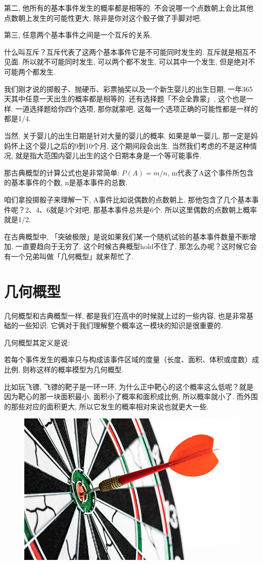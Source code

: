 第二, 他所有的基本事件发生的概率都是相等的. 不会说哪一个点数朝上会比其他点数朝上发生的可能性更大, 除非是你对这个骰子做了手脚对吧. 

第三, 任意两个基本事件之间是一个互斥的关系. 

什么叫互斥？互斥代表了这两个基本事件它是不可能同时发生的. 互斥就是相互不见面. 所以就不可能同时发生, 可以两个都不发生, 可以其中一个发生, 但是绝对不可能两个都发生. 

我们刚才说的掷骰子、抛硬币、彩票抽奖以及一个新生婴儿的出生日期, 一年365天其中任意一天出生的概率都是相等的. 还有选择题「不会全靠蒙」, 这个也是一样. 一道选择题给你四个选项, 那你就蒙吧, 这每一个选项正确的可能性都是一样的都是1/4. 

当然, 关于婴儿的出生日期是针对大量的婴儿的概率. 如果是单一婴儿, 那一定是妈妈怀上这个婴儿之后的9到10个月, 这个期间段会出生. 当然我们考虑的不是这种情况, 就是指大范围内婴儿出生的这个日期本身是一个等可能事件. 

那古典概型的计算公式也是非常简单: $P(A)  = m/n$, m代表了A这个事件所包含的基本事件的个数, n是基本事件的总数. 

咱们拿投掷骰子来理解一下, A事件比如说偶数的点数朝上, 那他包含了几个基本事件呢？2、4、6就是3个对吧, 那基本事件总共是6个. 所以这里偶数的点数朝上概率就是1/2. 

在古典概型中, 「突破极限」是说如果我们某一个随机试验的基本事件数量不断增加, 一直要趋向于无穷了. 这个时候古典概型hold不住了, 那怎么办呢？这时候它会有一个兄弟叫做「几何概型」就来帮忙了. 

\section{几何概型}

几何概型和古典概型一样, 都是我们在高中的时候就上过的一些内容, 也是非常基础的一些知识. 它俩对于我们理解整个概率这一模块的知识是很重要的. 

几何概型其定义是说: 

\begin{newquotation}
若每个事件发生的概率只与构成该事件区域的度量（长度、面积、体积或度数）成比例, 则称这样的概率模型为几何概型. 
\end{newquotation}

比如玩飞镖, 飞镖的靶子是一环一环, 为什么正中靶心的这个概率这么低呢？就是因为靶心的那一块面积最小, 面积小了概率和面积成比例, 所以概率就小了. 而外围的那些对应的面积更大, 所以它发生的概率相对来说也就更大一些. 

\begin{figure}[ht]
  \centering
  \includegraphics[width=0.5\linewidth]{asset/15582365192_640x420.jpg}
  \caption{}
  \label{fig:img21_1}
\end{figure}

